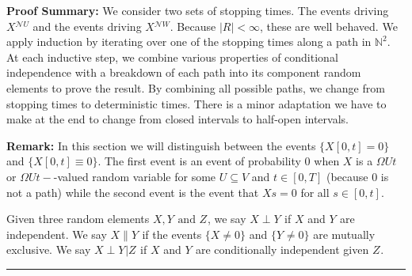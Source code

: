 \documentclass[12pt]{article}
\newcommand{\skipLine}{\vspace{12pt}}
\newcommand{\mb}{\mathbb}
\newcommand{\mc}{\mathcal}
\newcommand{\te}{\text}
\newcommand{\pfsum}{\textbf{Proof Summary: }}
\newcommand{\ind}{\hspace{24pt}}
\newcommand{\lin}{\rule{\linewidth}{0.4 pt}}
\renewcommand{\U}{U}							%
\newcommand{\UU}{W}								%
\newcommand{\UUU}{R}							%
\newcommand{\T}{T}								%
\renewcommand{\t}{t}							%
\renewcommand{\tt}{s}							%
\newcommand{\X}{X}								%
\newcommand{\neigh}{\mc{N}}						%
\newcommand{\rxvtts}[2]{Y_{#1}{#2}}					%
\newcommand{\rxvttts}[2]{Z_{#1}{#2}}				%
\newcommand{\mutex}{\|}								%
\begin{document}
\pfsum We consider two sets of stopping times. The events driving \(\X{}{}^{\neigh{\U}}\) and the events driving \(\X{}{}^{\neigh{\UU}}\). Because \(|\UUU| < \infty\), these are well behaved. We apply induction by iterating over one of the stopping times along a path in \(\mb{N}^2\). At each inductive step, we combine various properties of conditional independence with a breakdown of each path into its component random elements to prove the result. By combining all possible paths, we change from stopping times to deterministic times. There is a minor adaptation we have to make at the end to change from closed intervals to half-open intervals.

\skipLine

\textbf{Remark:} In this section we will distinguish between the events \(\{\X{}{[0,\t]} = 0\}\) and \(\{\X{}{[0,\t]}\equiv 0\}\). The first event is an event of probability 0 when \(\X{}{}\) is a \(\Omega{\U}{\t}\) or \(\Omega{\U}{\t-}\)-valued random variable for some \(\U\subseteq  V\) and \(\t \in [0,\T]\) (because 0 is not a path) while the second event is the event that \(\X{}{\tt} = 0\) for all \(\tt \in [0,\t]\).

\ind Given three random elements \(\X{}{},\rxvtts{}{} \te{ and } \rxvttts{}{}\), we say \(\X{}{}\perp \rxvtts{}{}\) if \(\X{}{}\) and \(\rxvtts{}{}\) are independent. We say \(\X{}{}\mutex \rxvtts{}{}\) if the events \(\{\X{}{}\neq 0\}\) and \(\{\rxvtts{}{} \neq 0\}\) are mutually exclusive. We say \(\X{}{}\perp \rxvtts{}{}|\rxvttts{}{}\) if \(\X{}{}\) and \(\rxvtts{}{}\) are conditionally independent given \(\rxvttts{}{}\).

\lin
\end{document}
